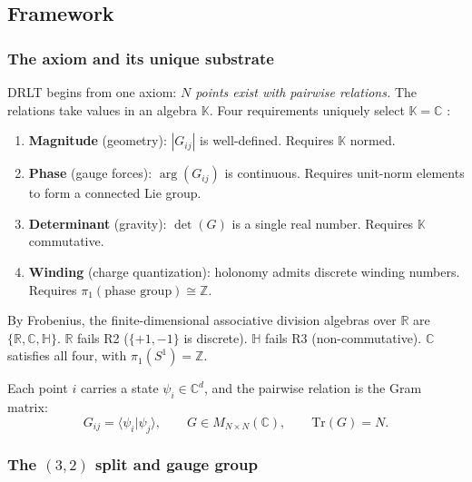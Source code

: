 \documentclass[12pt]{article}
\theoremstyle{remark}
\theoremstyle{definition}
\newcommand{\CC}{\mathbb{C}}
\newcommand{\RR}{\mathbb{R}}
\begin{document}
\subsection{Framework}
\label{sec:framework}

\subsubsection{The axiom and its unique substrate}

DRLT begins from one axiom: \emph{$N$ points exist with pairwise
relations.} The relations take values in an algebra $\mathbb{K}$.
Four requirements uniquely select $\mathbb{K} = \CC$
\cite{Frobenius}:

\begin{enumerate}
\item[\textbf{R1.}] \textbf{Magnitude} (geometry): $|G_{ij}|$ is
  well-defined. Requires $\mathbb{K}$ normed.
\item[\textbf{R2.}] \textbf{Phase} (gauge forces): $\arg(G_{ij})$ is
  continuous. Requires unit-norm elements to form a connected Lie group.
\item[\textbf{R3.}] \textbf{Determinant} (gravity): $\det(G)$ is a
  single real number. Requires $\mathbb{K}$ commutative.
\item[\textbf{R4.}] \textbf{Winding} (charge quantization): holonomy
  admits discrete winding numbers. Requires
  $\pi_1(\text{phase group}) \cong \mathbb{Z}$.
\end{enumerate}

\noindent
By Frobenius, the finite-dimensional associative division algebras over
$\RR$ are $\{\RR, \CC, \mathbb{H}\}$. $\RR$
fails R2 ($\{+1,-1\}$ is discrete). $\mathbb{H}$ fails R3
(non-commutative). $\CC$ satisfies all four, with
$\pi_1(S^1) = \mathbb{Z}$.

Each point $i$ carries a state $\psi_i \in \CC^d$, and the
pairwise relation is the Gram matrix:
\begin{equation}
G_{ij} = \langle \psi_i | \psi_j \rangle, \qquad
G \in M_{N \times N}(\CC), \qquad
\mathrm{Tr}(G) = N.
\end{equation}

\subsubsection{The $(3,2)$ split and gauge group}
\end{document}
